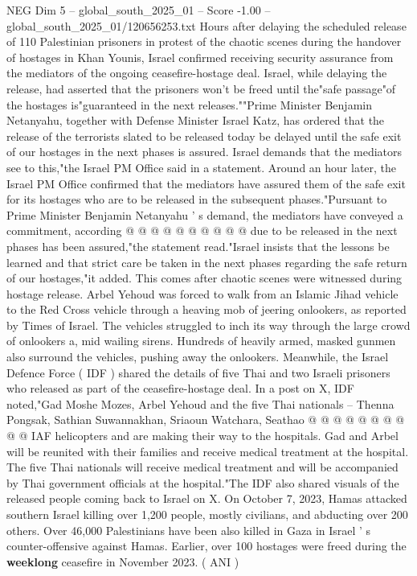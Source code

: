 \begin{textsample}{NEG Dim 5 – global\_south\_2025\_01 – Score -1.00 – global\_south\_2025\_01/120656253.txt}  \label{ex:f5_neg_153}
Hours after delaying the scheduled release of 110 Palestinian prisoners in protest of the chaotic scenes during the handover of hostages in Khan Younis, Israel confirmed receiving security assurance from the mediators of the ongoing ceasefire-hostage deal.
Israel, while delaying the release, had asserted that the prisoners won't be freed until the"safe passage"of the hostages is"guaranteed in the next releases.""Prime Minister Benjamin Netanyahu, together with Defense Minister Israel Katz, has ordered that the release of the terrorists slated to be released today be delayed until the safe exit of our hostages in the next phases is assured.
Israel demands that the mediators see to this,"the Israel PM Office said in a statement.
Around an hour later, the Israel PM Office confirmed that the mediators have assured them of the safe exit for its hostages who are to be released in the subsequent phases."Pursuant to Prime Minister Benjamin Netanyahu ' s demand, the mediators have conveyed a commitment, according @ @ @ @ @ @ @ @ @ @ due to be released in the next phases has been assured,"the statement read."Israel insists that the lessons be learned and that strict care be taken in the next phases regarding the safe return of our hostages,"it added.
This comes after chaotic scenes were witnessed during hostage release.
Arbel Yehoud was forced to walk from an Islamic Jihad vehicle to the Red Cross vehicle through a heaving mob of jeering onlookers, as reported by Times of Israel.
The vehicles struggled to inch its way through the large crowd of onlookers a, mid wailing sirens.
Hundreds of heavily armed, masked gunmen also surround the vehicles, pushing away the onlookers.
Meanwhile, the Israel Defence Force ( IDF ) shared the details of five Thai and two Israeli prisoners who released as part of the ceasefire-hostage deal.
In a post on X, IDF noted,"Gad Moshe Mozes, Arbel Yehoud and the five Thai nationals -- Thenna Pongsak, Sathian Suwannakhan, Sriaoun Watchara, Seathao @ @ @ @ @ @ @ @ @ @ IAF helicopters and are making their way to the hospitals.
Gad and Arbel will be reunited with their families and receive medical treatment at the hospital.
The five Thai nationals will receive medical treatment and will be accompanied by Thai government officials at the hospital."The IDF also shared visuals of the released people coming back to Israel on X.
On October 7, 2023, Hamas attacked southern Israel killing over 1,200 people, mostly civilians, and abducting over 200 others.
Over 46,000 Palestinians have been also killed in Gaza in Israel ' s counter-offensive against Hamas.
Earlier, over 100 hostages were freed during the \textbf{weeklong} ceasefire in November 2023. ( ANI )

\end{textsample}
